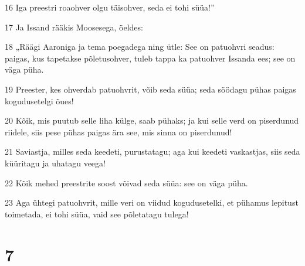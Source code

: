 \par 16 Iga preestri roaohver olgu täisohver, seda ei tohi süüa!”
\par 17 Ja Issand rääkis Moosesega, öeldes:
\par 18 „Räägi Aaroniga ja tema poegadega ning ütle: See on patuohvri seadus: paigas, kus tapetakse põletusohver, tuleb tappa ka patuohver Issanda ees; see on väga püha.
\par 19 Preester, kes ohverdab patuohvrit, võib seda süüa; seda söödagu pühas paigas kogudusetelgi õues!
\par 20 Kõik, mis puutub selle liha külge, saab pühaks; ja kui selle verd on piserdunud riidele, siis pese pühas paigas ära see, mis sinna on piserdunud!
\par 21 Saviastja, milles seda keedeti, purustatagu; aga kui keedeti vaskastjas, siis seda küüritagu ja uhatagu veega!
\par 22 Kõik mehed preestrite soost võivad seda süüa: see on väga püha.
\par 23 Aga ühtegi patuohvrit, mille veri on viidud kogudusetelki, et pühamus lepitust toimetada, ei tohi süüa, vaid see põletatagu tulega!

\chapter{7}

